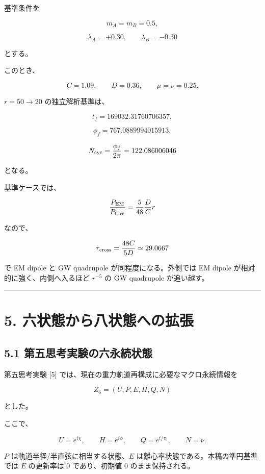 \documentclass[
  a4paper,
]{ltjsarticle}
\begin{document}
基準条件を

\[
m_A=m_B=0.5,
\]

\[
\lambda_A=+0.30,
\qquad
\lambda_B=-0.30
\]

とする。

このとき、

\[
C=1.09,
\qquad
D=0.36,
\qquad
\mu=\nu=0.25.
\]

\(r=50\rightarrow20\) の独立解析基準は、

\[
t_f=169032.31760706357,
\]

\[
\phi_f=767.0889994015913,
\]

\[
N_{\rm cyc}=\frac{\phi_f}{2\pi}
=122.086006046
\]

となる。

基準ケースでは、

\[
\frac{P_{\rm EM}}{P_{\rm GW}}
=
\frac{5}{48}\frac{D}{C}r
\]

なので、

\[
r_{\rm cross}
=
\frac{48C}{5D}
\simeq29.0667
\]

で EM dipole と GW quadrupole が同程度になる。外側では EM dipole
が相対的に強く、内側へ入るほど \(r^{-5}\) の GW quadrupole が追い越す。

\begin{center}\rule{0.5\linewidth}{0.5pt}\end{center}

\section{5.
六状態から八状態への拡張}\label{ux516dux72b6ux614bux304bux3089ux516bux72b6ux614bux3078ux306eux62e1ux5f35}

\subsection{5.1
第五思考実験の六永続状態}\label{ux7b2cux4e94ux601dux8003ux5b9fux9a13ux306eux516dux6c38ux7d9aux72b6ux614b}

第五思考実験 {[}5{]} では、現在の重力軌道再構成に必要なマクロ永続情報を

\[
Z_6=(U,P,E,H,Q,N)
\]

とした。

ここで、

\[
U=e^{i\chi},
\qquad
H=e^{i\phi},
\qquad
Q=e^{t/\tau_0},
\qquad
N=\nu.
\]

\(P\) は軌道半径/半直弦に相当する状態、\(E\)
は離心率状態である。本稿の準円基準では \(E\) の更新率は 0 であり、初期値
0 のまま保持される。
\end{document}
